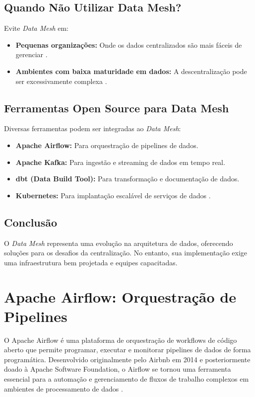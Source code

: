 \subsection{Quando Não Utilizar Data Mesh?}
Evite \textit{Data Mesh} em:
\begin{itemize}
    \item \textbf{Pequenas organizações:} Onde os dados centralizados são mais fáceis de gerenciar \cite{johnson2021scaling}.
    \item \textbf{Ambientes com baixa maturidade em dados:} A descentralização pode ser excessivamente complexa \cite{akhtar2021mesh}.
\end{itemize}

\subsection{Ferramentas Open Source para Data Mesh}
Diversas ferramentas podem ser integradas ao \textit{Data Mesh}:
\begin{itemize}
    \item \textbf{Apache Airflow:} Para orquestração de pipelines de dados.
    \item \textbf{Apache Kafka:} Para ingestão e streaming de dados em tempo real.
    \item \textbf{dbt (Data Build Tool):} Para transformação e documentação de dados.
    \item \textbf{Kubernetes:} Para implantação escalável de serviços de dados \cite{smith2023tools}.
\end{itemize}

\subsection{Conclusão}
O \textit{Data Mesh} representa uma evolução na arquitetura de dados, oferecendo soluções para os desafios da centralização. No entanto, sua implementação exige uma infraestrutura bem projetada e equipes capacitadas.


\section{Apache Airflow: Orquestração de Pipelines}

O Apache Airflow é uma plataforma de orquestração de workflows de código aberto que permite programar, executar e monitorar pipelines de dados de forma programática. Desenvolvido originalmente pelo Airbnb em 2014 e posteriormente doado à Apache Software Foundation, o Airflow se tornou uma ferramenta essencial para a automação e gerenciamento de fluxos de trabalho complexos em ambientes de processamento de dados \cite{airflow_concepts}.

